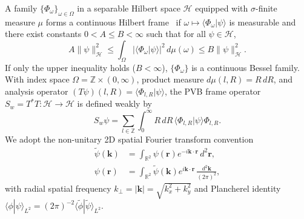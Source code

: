 \documentclass[aps,pra,reprint,nofootinbib,floatfix,longbibliography]{revtex4-2}
\theoremstyle{remark}
\newcommand{\braket}[2]{\langle #1 | #2 \rangle}
\newcommand{\norm}[1]{\lVert #1 \rVert}
\newcommand{\abs}[1]{\lvert #1 \rvert}
\begin{document}
A family $\{\Phi_\omega\}_{\omega\in\Omega}$ in a separable Hilbert space $\mathcal{H}$ equipped with $\sigma$-finite measure $\mu$ forms a continuous Hilbert frame~\cite{Duffin1952,Daubechies1990,Ali1993,Christensen2016} if $\omega \mapsto \braket{\Phi_\omega}{\psi}$ is measurable and there exist constants $0 < A \le B < \infty$ such that for all $\psi \in \mathcal{H}$,
\begin{equation}
A \norm{\psi}_{\mathcal{H}}^2 \le \int_\Omega \abs{\braket{\Phi_\omega}{\psi}}^2\,d\mu(\omega) \le B \norm{\psi}_{\mathcal{H}}^2.
\label{eq:frame_def}
\end{equation}
If only the upper inequality holds ($B < \infty$), $\{\Phi_\omega\}$ is a continuous Bessel family. With index space $\Omega = \mathbb{Z} \times (0,\infty)$, product measure $d\mu(l,R) = R\,dR$, and analysis operator $(T\psi)(l,R) = \braket{\Phi_{l,R}}{\psi}$, the PVB frame operator $S_w = T^* T : \mathcal{H} \to \mathcal{H}$ is defined weakly by
\begin{equation}
S_w\psi = \sum_{l\in\mathbb{Z}} \int_0^\infty R\,dR\, \braket{\Phi_{l,R}}{\psi}\Phi_{l,R}.
\label{eq:frame_op}
\end{equation}
We adopt the non-unitary 2D spatial Fourier transform convention
\begin{align}
\widetilde{\psi}(\mathbf{k}) &= \int_{\mathbb{R}^2} \psi(\mathbf{r}) e^{-i\mathbf{k}\cdot\mathbf{r}}\,d^2\mathbf{r}, \nonumber \\
\psi(\mathbf{r}) &= \int_{\mathbb{R}^2} \widetilde{\psi}(\mathbf{k}) e^{i\mathbf{k}\cdot\mathbf{r}}\,\frac{d^2\mathbf{k}}{(2\pi)^2},
\label{eq:ft_convention}
\end{align}
with radial spatial frequency $k_\perp = \abs{\mathbf{k}} = \sqrt{k_x^2 + k_y^2}$ and Plancherel identity $\braket{\phi}{\psi}_{L^2} = (2\pi)^{-2}\braket{\widetilde{\phi}}{\widetilde{\psi}}_{L^2}$.
\end{document}
